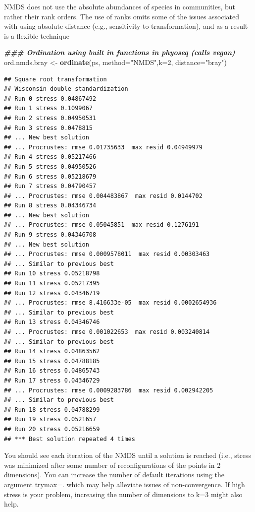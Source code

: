 \documentclass[
]{book}
\newenvironment{Shaded}{\begin{snugshade}}{\end{snugshade}}
\newcommand{\AttributeTok}[1]{\textcolor[rgb]{0.13,0.29,0.53}{#1}}
\newcommand{\DecValTok}[1]{\textcolor[rgb]{0.00,0.00,0.81}{#1}}
\newcommand{\DocumentationTok}[1]{\textcolor[rgb]{0.56,0.35,0.01}{\textbf{\textit{#1}}}}
\newcommand{\FunctionTok}[1]{\textcolor[rgb]{0.13,0.29,0.53}{\textbf{#1}}}
\newcommand{\NormalTok}[1]{#1}
\newcommand{\OtherTok}[1]{\textcolor[rgb]{0.56,0.35,0.01}{#1}}
\newcommand{\StringTok}[1]{\textcolor[rgb]{0.31,0.60,0.02}{#1}}
\begin{document}
NMDS does not use the absolute abundances of species in communities, but rather their rank orders. The use of ranks omits some of the issues associated with using absolute distance (e.g., sensitivity to transformation), and as a result is a flexible technique

\begin{Shaded}
\begin{Highlighting}[]
    \DocumentationTok{\#\#\# Ordination using built in functions in phyoseq (calls vegan)    }
\NormalTok{ord.nmds.bray }\OtherTok{\textless{}{-}} \FunctionTok{ordinate}\NormalTok{(ps, }\AttributeTok{method=}\StringTok{"NMDS"}\NormalTok{,}\AttributeTok{k=}\DecValTok{2}\NormalTok{, }\AttributeTok{distance=}\StringTok{"bray"}\NormalTok{)}
\end{Highlighting}
\end{Shaded}

\begin{verbatim}
## Square root transformation
## Wisconsin double standardization
## Run 0 stress 0.04867492 
## Run 1 stress 0.1099067 
## Run 2 stress 0.04950531 
## Run 3 stress 0.0478815 
## ... New best solution
## ... Procrustes: rmse 0.01735633  max resid 0.04949979 
## Run 4 stress 0.05217466 
## Run 5 stress 0.04950526 
## Run 6 stress 0.05218679 
## Run 7 stress 0.04790457 
## ... Procrustes: rmse 0.004483867  max resid 0.0144702 
## Run 8 stress 0.04346734 
## ... New best solution
## ... Procrustes: rmse 0.05045851  max resid 0.1276191 
## Run 9 stress 0.04346708 
## ... New best solution
## ... Procrustes: rmse 0.0009578011  max resid 0.00303463 
## ... Similar to previous best
## Run 10 stress 0.05218798 
## Run 11 stress 0.05217395 
## Run 12 stress 0.04346719 
## ... Procrustes: rmse 8.416633e-05  max resid 0.0002654936 
## ... Similar to previous best
## Run 13 stress 0.04346746 
## ... Procrustes: rmse 0.001022653  max resid 0.003240814 
## ... Similar to previous best
## Run 14 stress 0.04863562 
## Run 15 stress 0.04788185 
## Run 16 stress 0.04865743 
## Run 17 stress 0.04346729 
## ... Procrustes: rmse 0.0009283786  max resid 0.002942205 
## ... Similar to previous best
## Run 18 stress 0.04788299 
## Run 19 stress 0.0521657 
## Run 20 stress 0.05216659 
## *** Best solution repeated 4 times
\end{verbatim}

You should see each iteration of the NMDS until a solution is reached (i.e., stress was minimized after some number of reconfigurations of the points in 2 dimensions). You can increase the number of default iterations using the argument trymax=. which may help alleviate issues of non-convergence. If high stress is your problem, increasing the number of dimensions to k=3 might also help.
\end{document}
